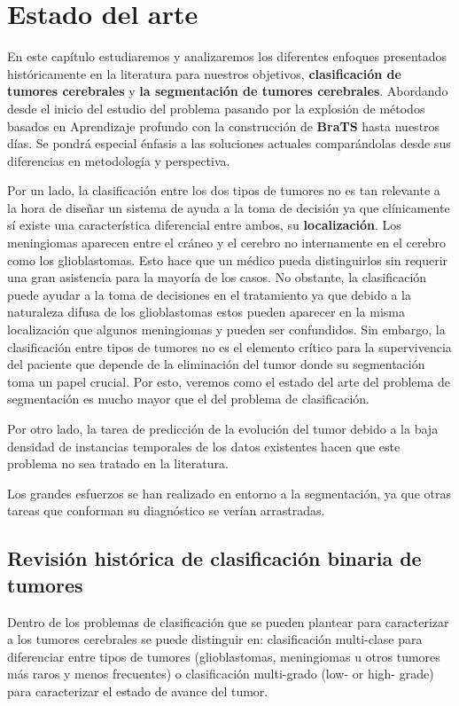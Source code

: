 \chapter{Estado del arte}

En este capítulo estudiaremos y analizaremos los diferentes enfoques presentados históricamente en la literatura para nuestros objetivos, \textbf{clasificación de tumores cerebrales} y \textbf{la segmentación de tumores cerebrales}. Abordando desde el inicio del estudio del problema pasando por la explosión de métodos basados en Aprendizaje profundo con la construcción de \textbf{BraTS} hasta nuestros días. Se pondrá especial énfasis a las soluciones actuales comparándolas desde sus diferencias en metodología y perspectiva.

Por un lado, la clasificación entre los dos tipos de tumores no es tan relevante a la hora de diseñar un sistema de ayuda a la toma de decisión ya que clínicamente sí existe una característica diferencial entre ambos, su \textbf{localización}. Los meningiomas aparecen entre el cráneo y el cerebro no internamente en el cerebro como los glioblastomas. Esto hace que un médico pueda distinguirlos sin requerir una gran asistencia para la mayoría de los casos. No obstante, la clasificación puede ayudar a la toma de decisiones en el tratamiento ya que debido a la naturaleza difusa de los glioblastomas estos pueden aparecer en la misma localización que algunos meningiomas y pueden ser confundidos. Sin embargo, la clasificación entre tipos de tumores no es el elemento crítico para la supervivencia del paciente que depende de la eliminación del tumor donde su segmentación toma un papel crucial. Por esto, veremos como el estado del arte del problema de segmentación es mucho mayor que el del problema de clasificación.

Por otro lado, la tarea de predicción de la evolución del tumor debido a la baja densidad de instancias temporales de los datos existentes hacen que este problema no sea tratado en la literatura. 

Los grandes esfuerzos se han realizado en entorno a la segmentación, ya que otras tareas que conforman su diagnóstico se verían arrastradas.

\section{Revisión histórica de clasificación binaria de tumores}

Dentro de los problemas de clasificación que se pueden plantear para caracterizar a los tumores cerebrales se puede distinguir en: clasificación multi-clase para diferenciar entre tipos de tumores (glioblastomas, meningiomas u otros tumores más raros y menos frecuentes) o clasificación multi-grado (low- or high- grade) para caracterizar el estado de avance del tumor.

